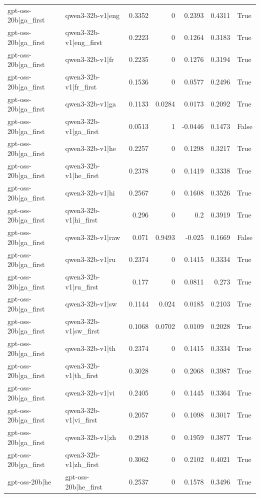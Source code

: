 \begin{table}
\begin{tabular}{l l r r r r l}
gpt-oss-20b|ga_first & qwen3-32b-v1|eng & 0.3352 & 0 & 0.2393 & 0.4311 & True \\
gpt-oss-20b|ga_first & qwen3-32b-v1|eng_first & 0.2223 & 0 & 0.1264 & 0.3183 & True \\
gpt-oss-20b|ga_first & qwen3-32b-v1|fr & 0.2235 & 0 & 0.1276 & 0.3194 & True \\
gpt-oss-20b|ga_first & qwen3-32b-v1|fr_first & 0.1536 & 0 & 0.0577 & 0.2496 & True \\
gpt-oss-20b|ga_first & qwen3-32b-v1|ga & 0.1133 & 0.0284 & 0.0173 & 0.2092 & True \\
gpt-oss-20b|ga_first & qwen3-32b-v1|ga_first & 0.0513 & 1 & -0.0446 & 0.1473 & False \\
gpt-oss-20b|ga_first & qwen3-32b-v1|he & 0.2257 & 0 & 0.1298 & 0.3217 & True \\
gpt-oss-20b|ga_first & qwen3-32b-v1|he_first & 0.2378 & 0 & 0.1419 & 0.3338 & True \\
gpt-oss-20b|ga_first & qwen3-32b-v1|hi & 0.2567 & 0 & 0.1608 & 0.3526 & True \\
gpt-oss-20b|ga_first & qwen3-32b-v1|hi_first & 0.296 & 0 & 0.2 & 0.3919 & True \\
gpt-oss-20b|ga_first & qwen3-32b-v1|raw & 0.071 & 0.9493 & -0.025 & 0.1669 & False \\
gpt-oss-20b|ga_first & qwen3-32b-v1|ru & 0.2374 & 0 & 0.1415 & 0.3334 & True \\
gpt-oss-20b|ga_first & qwen3-32b-v1|ru_first & 0.177 & 0 & 0.0811 & 0.273 & True \\
gpt-oss-20b|ga_first & qwen3-32b-v1|sw & 0.1144 & 0.024 & 0.0185 & 0.2103 & True \\
gpt-oss-20b|ga_first & qwen3-32b-v1|sw_first & 0.1068 & 0.0702 & 0.0109 & 0.2028 & True \\
gpt-oss-20b|ga_first & qwen3-32b-v1|th & 0.2374 & 0 & 0.1415 & 0.3334 & True \\
gpt-oss-20b|ga_first & qwen3-32b-v1|th_first & 0.3028 & 0 & 0.2068 & 0.3987 & True \\
gpt-oss-20b|ga_first & qwen3-32b-v1|vi & 0.2405 & 0 & 0.1445 & 0.3364 & True \\
gpt-oss-20b|ga_first & qwen3-32b-v1|vi_first & 0.2057 & 0 & 0.1098 & 0.3017 & True \\
gpt-oss-20b|ga_first & qwen3-32b-v1|zh & 0.2918 & 0 & 0.1959 & 0.3877 & True \\
gpt-oss-20b|ga_first & qwen3-32b-v1|zh_first & 0.3062 & 0 & 0.2102 & 0.4021 & True \\
gpt-oss-20b|he & gpt-oss-20b|he_first & 0.2537 & 0 & 0.1578 & 0.3496 & True \\

\end{tabular}
\end{table}
